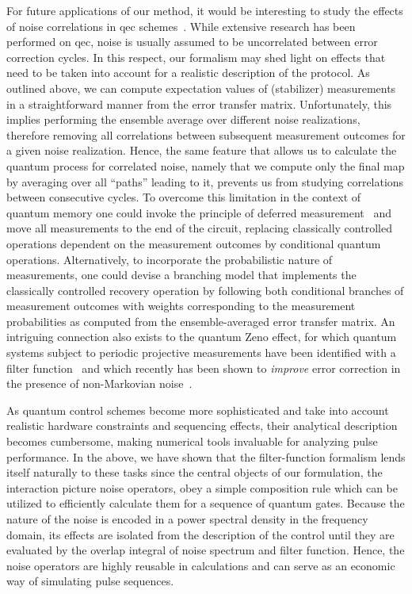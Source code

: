 For future applications of our method, it would be interesting to study the effects of noise correlations in \gls{qec} schemes~\cite{Devitt2013,Ng2011,Nickerson2019,Clader2021,Liu2024b}.
While extensive research has been performed on \gls{qec}, noise is usually assumed to be uncorrelated between error correction cycles.
In this respect, our formalism may shed light on effects that need to be taken into account for a realistic description of the protocol.
As outlined above, we can compute expectation values of (stabilizer) measurements in a straightforward manner from the error transfer matrix.
Unfortunately, this implies performing the ensemble average over different noise realizations, therefore removing all correlations between subsequent measurement outcomes for a given noise realization.
Hence, the same feature that allows us to calculate the quantum process for correlated noise, namely that we compute only the final map by averaging over all \enquote{paths} leading to it, prevents us from studying correlations between consecutive cycles.
To overcome this limitation in the context of quantum memory one could invoke the principle of deferred measurement~\cite{Nielsen2011} and move all measurements to the end of the circuit, replacing classically controlled operations dependent on the measurement outcomes by conditional quantum operations.
Alternatively, to incorporate the probabilistic nature of measurements, one could devise a branching model that implements the classically controlled recovery operation by following both conditional branches of measurement outcomes with weights corresponding to the measurement probabilities as computed from the ensemble-averaged error transfer matrix.
An intriguing connection also exists to the quantum Zeno effect, for which quantum systems subject to periodic projective measurements have been identified with a filter function~\cite{Kofman2000,Kofman2001,Chaudhry2016} and which recently has been shown to \emph{improve} error correction in the presence of non-Markovian noise~\cite{Nila2025}.

As quantum control schemes become more sophisticated and take into account realistic hardware constraints and sequencing effects, their analytical description becomes cumbersome, making numerical tools invaluable for analyzing pulse performance.
In the above, we have shown that the filter-function formalism lends itself naturally to these tasks since the central objects of our formulation, the interaction picture noise operators, obey a simple composition rule which can be utilized to efficiently calculate them for a sequence of quantum gates.
Because the nature of the noise is encoded in a power spectral density in the frequency domain, its effects are isolated from the description of the control until they are evaluated by the overlap integral of noise spectrum and filter function.
Hence, the noise operators are highly reusable in calculations and can serve as an economic way of simulating pulse sequences.

